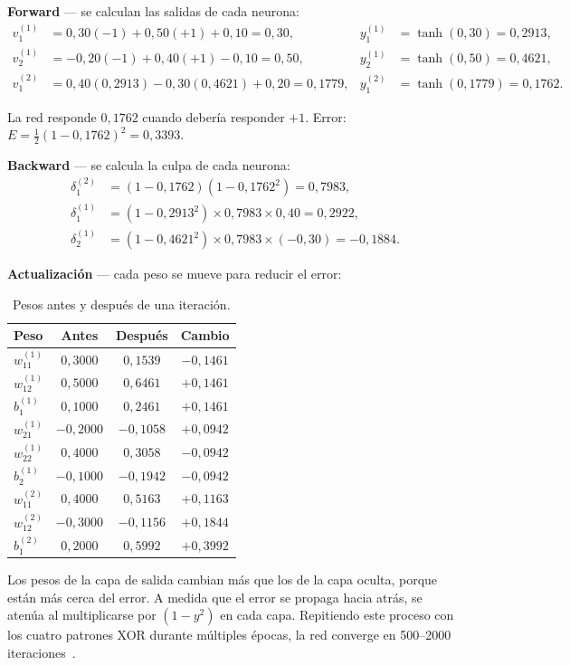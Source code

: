 \textbf{Forward} --- se calculan las salidas de cada neurona:
\begin{align*}
    v_1^{(1)} &= 0{,}30(-1) + 0{,}50(+1) + 0{,}10 = 0{,}30, & y_1^{(1)} &= \tanh(0{,}30) = 0{,}2913, \\
    v_2^{(1)} &= -0{,}20(-1) + 0{,}40(+1) - 0{,}10 = 0{,}50, & y_2^{(1)} &= \tanh(0{,}50) = 0{,}4621, \\
    v_1^{(2)} &= 0{,}40(0{,}2913) - 0{,}30(0{,}4621) + 0{,}20 = 0{,}1779, & y_1^{(2)} &= \tanh(0{,}1779) = 0{,}1762.
\end{align*}

La red responde $0{,}1762$ cuando debería responder $+1$. Error: $E = \tfrac{1}{2}(1 - 0{,}1762)^2 = 0{,}3393$.

\textbf{Backward} --- se calcula la culpa de cada neurona:
\begin{align*}
    \delta_1^{(2)} &= (1 - 0{,}1762)(1 - 0{,}1762^2) = 0{,}7983, \\
    \delta_1^{(1)} &= (1 - 0{,}2913^2) \times 0{,}7983 \times 0{,}40 = 0{,}2922, \\
    \delta_2^{(1)} &= (1 - 0{,}4621^2) \times 0{,}7983 \times (-0{,}30) = -0{,}1884.
\end{align*}

\textbf{Actualización} --- cada peso se mueve para reducir el error:

\begin{table}[H]
    \centering\small
    \caption{Pesos antes y después de una iteración.}
    \label{tab:pesos-actualizados}
    \begin{tabular}{lccc}
        \toprule
        \textbf{Peso} & \textbf{Antes} & \textbf{Después} & \textbf{Cambio} \\
        \midrule
        $w_{11}^{(1)}$ & $0{,}3000$ & $0{,}1539$ & $-0{,}1461$ \\
        $w_{12}^{(1)}$ & $0{,}5000$ & $0{,}6461$ & $+0{,}1461$ \\
        $b_1^{(1)}$    & $0{,}1000$ & $0{,}2461$ & $+0{,}1461$ \\
        $w_{21}^{(1)}$ & $-0{,}2000$ & $-0{,}1058$ & $+0{,}0942$ \\
        $w_{22}^{(1)}$ & $0{,}4000$ & $0{,}3058$ & $-0{,}0942$ \\
        $b_2^{(1)}$    & $-0{,}1000$ & $-0{,}1942$ & $-0{,}0942$ \\
        $w_{11}^{(2)}$ & $0{,}4000$ & $0{,}5163$ & $+0{,}1163$ \\
        $w_{12}^{(2)}$ & $-0{,}3000$ & $-0{,}1156$ & $+0{,}1844$ \\
        $b_1^{(2)}$    & $0{,}2000$ & $0{,}5992$ & $+0{,}3992$ \\
        \bottomrule
    \end{tabular}
\end{table}

Los pesos de la capa de salida cambian más que los de la capa oculta, porque están más cerca del error. A medida que el error se propaga hacia atrás, se atenúa al multiplicarse por $(1-y^2)$ en cada capa. Repitiendo este proceso con los cuatro patrones XOR durante múltiples épocas, la red converge en 500--2000 iteraciones~\cite{lecun2012efficient}.
